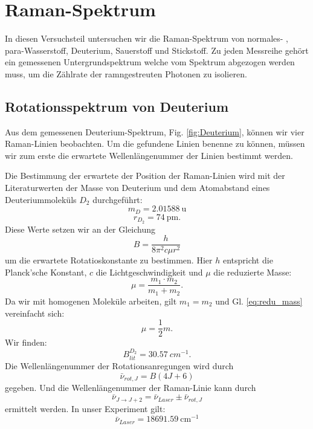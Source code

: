 \documentclass[11 pt]{article}
\begin{document}
\section{Raman-Spektrum}
In diesen Versuchsteil untersuchen wir die Raman-Spektrum von normales- , para-Wasserstoff, Deuterium, Sauerstoff und Stickstoff. Zu jeden Messreihe gehört ein gemessenen Untergrundspektrum welche vom Spektrum abgezogen werden muss, um die Zählrate der ramngestreuten Photonen zu isolieren. 

\subsection{Rotationsspektrum von Deuterium}
Aus dem gemessenen Deuterium-Spektrum, Fig. \ref{fig:Deuterium}, können wir vier Raman-Linien beobachten. Um die gefundene Linien benenne zu können, müssen wir zum erste die erwartete Wellenlängenummer der Linien bestimmt werden.

Die Bestimmung der erwartete der Position der Raman-Linien wird mit der Literaturwerten der Masse von Deuterium und dem Atomabstand eines Deuteriummoleküls $D_2$ durchgeführt:
$$m_{D} =\SI{2.01588}{\atomicmassunit}$$
$$r_{D_2} = \SI{74}{\pm}.$$
Diese Werte setzen wir an der Gleichung
\begin{equation}
\label{eq:Rot_const}
B = \frac{h}{8\pi^2 c \mu r^2}
\end{equation}
um die erwartete Rotatioskonstante zu bestimmen. Hier $h$ entspricht die Planck'sche Konstant, $c$ die Lichtgeschwindigkeit und $\mu$ die reduzierte Masse:
\begin{equation}
\label{eq:redu_mass}
\mu = \dfrac{m_1\cdot m_2}{m_1 + m_2}.
\end{equation}
Da wir mit homogenen Moleküle arbeiten, gilt $m_1 = m_2$ und Gl. \ref{eq:redu_mass} vereinfacht sich:
\begin{equation}
\mu = \dfrac{1}{2} m.
\end{equation}
Wir finden: 
$$B_{lit}^{D_2} = \SI{30.57}{cm^{-1}}.$$
Die Wellenlängenummer der Rotationsanregungen wird durch
\begin{equation}
\label{eq:nu_rot,j} 
\bar{\nu}_{rot,J} = B(4J+6)
\end{equation}
gegeben. Und die Wellenlängenummer der Raman-Linie kann durch
\begin{equation}
\bar{\nu}_{J\to J+2} = \bar{\nu}_{Laser}\pm \bar{\nu}_{rot,J}
\end{equation}
ermittelt werden. In unser Experiment gilt:
$$\bar{\nu}_{Laser} = \SI{18691.59}{\centi\meter^{-1}}$$
\end{document}
